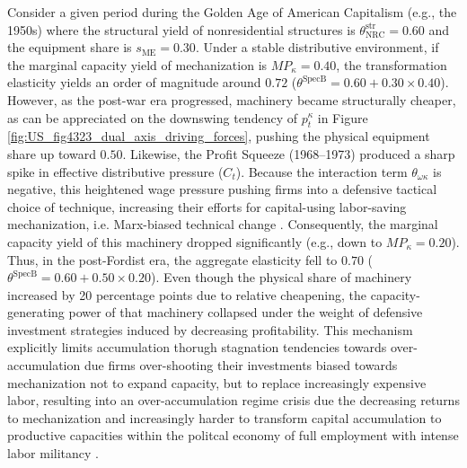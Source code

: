Consider a given period during the Golden Age of American Capitalism (e.g., the 1950s) where the structural yield of nonresidential structures is $\theta_{\text{NRC}}^{\text{str}} = 0.60$ and the equipment share is $s_{\text{ME}} = 0.30$. Under a stable distributive environment, if the marginal capacity yield of mechanization is $MP_{\kappa} = 0.40$, the transformation elasticity yields an order of magnitude around $0.72$ ($\theta^{\text{SpecB}} = 0.60 + 0.30 \times 0.40$). However, as the post-war era progressed, machinery became structurally cheaper, as can be appreciated on the downswing tendency of $p_t^{\kappa}$ in Figure \ref{fig:US_fig4323_dual_axis_driving_forces}, pushing the physical equipment share up toward $0.50$. Likewise, the Profit Squeeze (1968--1973) produced a sharp spike in effective distributive pressure ($C_t$). Because the interaction term $\theta_{\omega\kappa}$ is negative, this heightened wage pressure pushing firms into a defensive tactical choice of technique, increasing their efforts for capital-using labor-saving mechanization, i.e. Marx-biased technical change \citep{Basu2022}. Consequently, the marginal capacity yield of this machinery dropped significantly (e.g., down to $MP_{\kappa} = 0.20$). Thus, in the post-Fordist era, the aggregate elasticity fell to $0.70$ ($\theta^{\text{SpecB}} = 0.60 + 0.50 \times 0.20$). Even though the physical share of machinery increased by 20 percentage points due to relative cheapening, the capacity-generating power of that machinery collapsed under the weight of defensive investment strategies induced by decreasing profitability. This mechanism explicitly limits accumulation thorugh stagnation tendencies towards over-accumulation due firms over-shooting their investments biased towards mechanization not to expand capacity, but to replace increasingly expensive labor, resulting into an over-accumulation regime crisis due the decreasing returns to mechanization and increasingly harder to transform capital accumulation to productive capacities within the politcal economy of full employment with intense labor militancy \cite{Kalecki1943}. 



